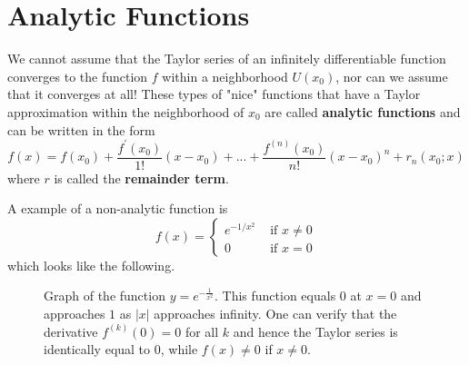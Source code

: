\section{Analytic Functions} 

  \begin{definition}
    \label{def:analytic-functions}
    We cannot assume that the Taylor series of an infinitely differentiable function converges to the function $f$ within a neighborhood $U(x_0)$, nor can we assume that it converges at all! These types of "nice" functions that have a Taylor approximation within the neighborhood of $x_0$ are called \textbf{analytic functions} and can be written in the form 
    \begin{equation}
      f(x) =  f(x_0) + \frac{f^\prime (x_0)}{1!} (x-x_0) + ... + \frac{f^{(n)} (x_0)}{n!} (x-x_0)^n + r_n (x_0; x)
    \end{equation}
    where $r$ is called the \textbf{remainder term}. 
  \end{definition}

  \begin{example}
    \label{ex:infinitely-differentiable-non-analytic-function}
    A example of a non-analytic function is
    \begin{equation}
      f(x) = \begin{cases} e^{-1/x^2} & \text{ if } x \neq 0 \\ 0 & \text{ if } x = 0 \end{cases}
    \end{equation}
    which looks like the following. 

    \begin{figure}[H]
      \centering 
      \caption{Graph of the function $y = e^{-\frac{1}{x^2}}$. This function equals $0$ at $x=0$ and approaches $1$ as $|x|$ approaches infinity. One can verify that the derivative $f^{(k)} (0) = 0$ for all $k$ and hence the Taylor series is identically equal to $0$, while $f(x) \neq 0$ if $x \neq 0$. }
      \label{fig:bump-function}
    \end{figure}
  \end{example}

